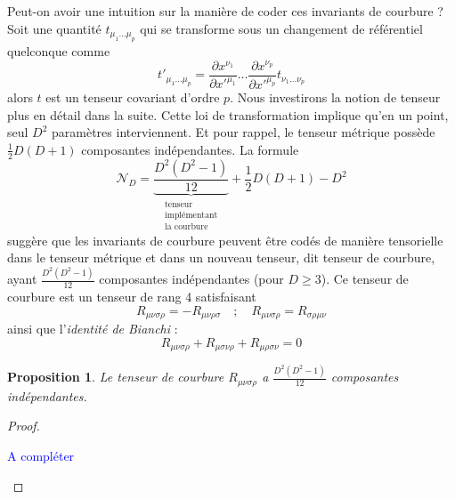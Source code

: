 \documentclass[a4paper,11pt]{report}
\theoremstyle{definition}
\theoremstyle{plain}
\newtheorem{prop}[thm]{Proposition}
\theoremstyle{definition}
\theoremstyle{remark}
\newcommand{\comp}{\begin{center}\textcolor{blue}{A compléter}\end{center}}
\newcommand{\p}{\partial}
\begin{document}
            Peut-on avoir une intuition sur la manière de coder ces invariants de courbure ? Soit une quantité $t_{\mu_1\dots\mu_p}$ qui se transforme sous un changement de référentiel quelconque comme
            \begin{equation}
                t'_{\mu_1\dots\mu_p} = \frac{\p x^{\nu_1}}{\p x'^{\mu_1}}\dots\frac{\p x^{\nu_p}}{\p x'^{\mu_p}} t_{\nu_1\dots\nu_p}
            \end{equation}
            alors $t$ est un tenseur covariant d'ordre $p$. Nous investirons la notion de tenseur plus en détail dans la suite. Cette loi de transformation implique qu'en un point, seul $D^2$ paramètres interviennent. Et pour rappel, le tenseur métrique possède $\frac{1}{2}D(D+1)$ composantes indépendantes. La formule
            \begin{equation}
                \mathscr{N}_D =  \underbrace{\frac{D^2(D^2-1)}{12}}_{\substack{\text{tenseur}\\ \text{implémentant} \\ \text{la courbure}}}+\frac{1}{2}D(D+1)-D^2
            \end{equation}
            suggère que les invariants de courbure peuvent être codés de manière tensorielle dans le tenseur métrique et dans un nouveau tenseur, dit tenseur de courbure, ayant $\frac{D^2(D^2-1)}{12}$ composantes indépendantes (pour $D\geq3$). Ce tenseur de courbure est un tenseur de rang 4 satisfaisant 
            \begin{equation}
                R_{\mu\nu\sigma\rho} = -R_{\mu\nu\rho\sigma}\quad ; \quad R_{\mu\nu\sigma\rho} = R_{\sigma\rho\mu\nu}
            \end{equation}
            ainsi que l'\textit{identité de Bianchi} :
            \begin{equation}
                R_{\mu\nu\sigma\rho}+R_{\mu\sigma\nu\rho}+R_{\mu\rho\sigma\nu} = 0
            \end{equation}
            
            \begin{prop}
                Le tenseur de courbure $R_{\mu\nu\sigma\rho}$ a $\frac{D^2(D^2-1)}{12}$ composantes indépendantes.
            \end{prop}
            
            \begin{proof}${}$\\
                \comp
            \end{proof}
            
\end{document}
